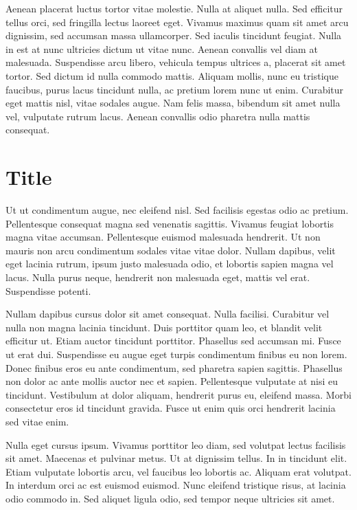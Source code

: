 \documentclass[
  a5paper,
  smalldemyvopaper,10pt,twoside,onecolumn,openright,extrafontsizes,hidelinks]{memoir}
\begin{document}
Aenean placerat luctus tortor vitae molestie. Nulla at aliquet nulla.
Sed efficitur tellus orci, sed fringilla lectus laoreet eget. Vivamus
maximus quam sit amet arcu dignissim, sed accumsan massa ullamcorper.
Sed iaculis tincidunt feugiat. Nulla in est at nunc ultricies dictum ut
vitae nunc. Aenean convallis vel diam at malesuada. Suspendisse arcu
libero, vehicula tempus ultrices a, placerat sit amet tortor. Sed dictum
id nulla commodo mattis. Aliquam mollis, nunc eu tristique faucibus,
purus lacus tincidunt nulla, ac pretium lorem nunc ut enim. Curabitur
eget mattis nisl, vitae sodales augue. Nam felis massa, bibendum sit
amet nulla vel, vulputate rutrum lacus. Aenean convallis odio pharetra
nulla mattis consequat.


\chapter{Title}\label{title-2}

Ut ut condimentum augue, nec eleifend nisl. Sed facilisis egestas odio
ac pretium. Pellentesque consequat magna sed venenatis sagittis. Vivamus
feugiat lobortis magna vitae accumsan. Pellentesque euismod malesuada
hendrerit. Ut non mauris non arcu condimentum sodales vitae vitae dolor.
Nullam dapibus, velit eget lacinia rutrum, ipsum justo malesuada odio,
et lobortis sapien magna vel lacus. Nulla purus neque, hendrerit non
malesuada eget, mattis vel erat. Suspendisse potenti.

Nullam dapibus cursus dolor sit amet consequat. Nulla facilisi.
Curabitur vel nulla non magna lacinia tincidunt. Duis porttitor quam
leo, et blandit velit efficitur ut. Etiam auctor tincidunt porttitor.
Phasellus sed accumsan mi. Fusce ut erat dui. Suspendisse eu augue eget
turpis condimentum finibus eu non lorem. Donec finibus eros eu ante
condimentum, sed pharetra sapien sagittis. Phasellus non dolor ac ante
mollis auctor nec et sapien. Pellentesque vulputate at nisi eu
tincidunt. Vestibulum at dolor aliquam, hendrerit purus eu, eleifend
massa. Morbi consectetur eros id tincidunt gravida. Fusce ut enim quis
orci hendrerit lacinia sed vitae enim.

Nulla eget cursus ipsum. Vivamus porttitor leo diam, sed volutpat lectus
facilisis sit amet. Maecenas et pulvinar metus. Ut at dignissim tellus.
In in tincidunt elit. Etiam vulputate lobortis arcu, vel faucibus leo
lobortis ac. Aliquam erat volutpat. In interdum orci ac est euismod
euismod. Nunc eleifend tristique risus, at lacinia odio commodo in. Sed
aliquet ligula odio, sed tempor neque ultricies sit amet.
\end{document}
